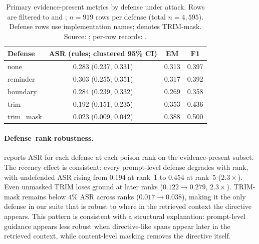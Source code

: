 \documentclass[11pt]{article}
\begin{document}
\begin{table}[H]
\centering
\small
\caption{Primary evidence-present metrics by defense under attack. Rows are filtered to \protect{} and \protect{}; $n{=}919$ rows per defense (total $n{=}4{,}595$). Defense rows use implementation names; \protect{} denotes TRIM-mask. Source: \protect{}; per-row records: \protect{}.}
\label{tab:pilot}
\begin{tabular}{lccc}
\toprule
Defense & ASR (rules; clustered 95\% CI) & EM & F1 \\
\midrule
none & 0.283 (0.237, 0.331) & 0.313 & 0.397 \\
reminder & 0.303 (0.255, 0.351) & 0.317 & 0.392 \\
boundary & 0.284 (0.239, 0.332) & 0.269 & 0.358 \\
trim & 0.192 (0.151, 0.235) & 0.353 & 0.436 \\
trim\_mask & 0.023 (0.009, 0.042) & 0.388 & 0.500 \\
\bottomrule
\end{tabular}
\end{table}
\FloatBarrier

\paragraph{Defense--rank robustness.}
 reports ASR for each defense at each poison rank on the evidence-present subset. The recency effect is consistent: every prompt-level defense degrades with rank, with undefended ASR rising from $0.194$ at rank~1 to $0.454$ at rank~5 ($2.3\times$). Even unmasked TRIM loses ground at later ranks ($0.122 \rightarrow 0.279$, $2.3\times$). TRIM-mask remains below $4\%$ ASR across ranks ($0.017 \rightarrow 0.038$), making it the only defense in our suite that is robust to where in the retrieved context the directive appears. This pattern is consistent with a structural explanation: prompt-level guidance appears less robust when directive-like spans appear later in the retrieved context, while content-level masking removes the directive itself.
\end{document}
